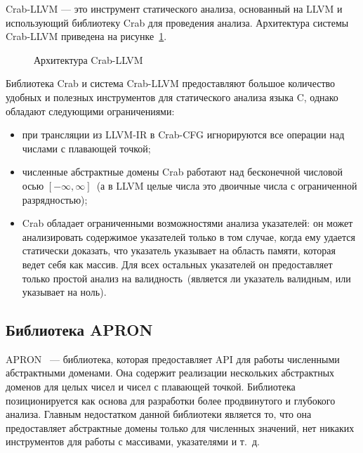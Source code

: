 Crab-LLVM --- это инструмент статического анализа, основанный на LLVM и 
использующий библиотеку Crab для проведения анализа. Архитектура системы 
Crab-LLVM приведена на рисунке~\ref{image:crabArchitecture}.
\begin{figure}[h!]
\caption{Архитектура Crab-LLVM}
\label{image:crabArchitecture}
\end{figure}

Библиотека Crab и система Crab-LLVM предоставляют большое количество удобных
и полезных инструментов для статического анализа языка C, однако обладают 
следующими ограничениями:
\begin{itemize}
\item при трансляции из LLVM-IR в Crab-CFG игнорируются все операции над 
числами с плавающей точкой;
\item численные абстрактные домены Crab работают над бесконечной числовой 
осью $[-\infty, \infty]$~(а в LLVM целые числа это двоичные числа с 
ограниченной разрядностью);
\item Crab обладает ограниченными возможностями анализа указателей: он может
анализировать содержимое указателей только в том случае, когда ему удается 
статически доказать, что указатель указывает на область памяти, которая ведет 
себя как массив. Для всех остальных указателей он предоставляет только простой
анализ на валидность~(является ли указатель валидным, или указывает на ноль).
\end{itemize}

\subsection{Библиотека APRON}
APRON~\cite{apron} --- библиотека, которая предоставляет API для работы 
численными абстрактными доменами. Она содержит реализации нескольких
абстрактных доменов для целых чисел и чисел с плавающей точкой. Библиотека 
позиционируется как основа для разработки более продвинутого и глубокого 
анализа. Главным недостатком данной библиотеки является то, что она предоставляет
абстрактные домены только для численных значений, нет никаких 
инструментов для работы с массивами, указателями и т.~д.

